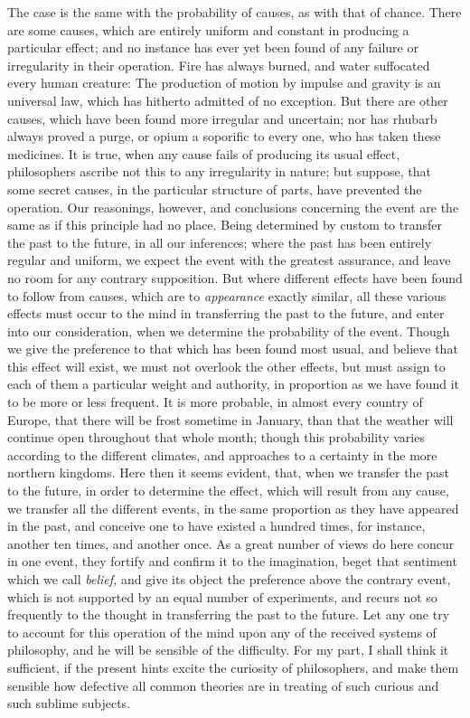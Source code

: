 \documentclass[]{article}
\begin{document}
\begin{sectionbody}
\humeparagraph  The case is the same with the probability of causes, as with that of chance. There are some causes, which are entirely uniform and constant in producing a particular effect; and no instance has ever yet been found of any failure or irregularity in their operation. Fire has always burned, and water suffocated every human creature: The production of motion by impulse and gravity is an universal law, which has hitherto admitted of no exception. But there are other causes, which have been found more irregular and uncertain; nor has rhubarb always proved a purge, or opium a soporific to every one, who has taken these medicines. It is true, when any cause fails of producing its usual effect, philosophers ascribe not this to any irregularity in nature; but suppose, that some secret causes, in the particular structure of parts, have prevented the operation. Our reasonings, however, and conclusions concerning the event are the same as if this principle had no place. Being determined by custom to transfer the past to the future, in all our inferences; where the past has been entirely regular and uniform, we expect the event with the greatest assurance, and leave no room for any contrary supposition. But where different effects have been found to follow from causes, which are to \emph{appearance} exactly similar, all these various effects must occur to the mind in transferring the past to the future, and enter into our consideration, when we determine the probability of the event. Though we give the preference to that which has been found most usual, and believe that this effect will exist, we must not overlook the other effects, but must assign to each of them a particular weight and authority, in proportion as we have found it to be more or less frequent. It is more probable, in almost every country of Europe, that there will be frost sometime in January, than that the weather will continue open throughout that whole month; though this probability varies according to the different climates, and approaches to a certainty in the more northern kingdoms. Here then it seems evident, that, when we transfer the past to the future, in order to determine the effect, which will result from any cause, we transfer all the different events, in the same proportion as they have appeared in the past, and conceive one to have existed a hundred times, for instance, another ten times, and another once. As a great number of views do here concur in one event, they fortify and confirm it to the imagination, beget that sentiment which we call \emph{belief,} and give its object the preference above the contrary event, which is not supported by an equal number of experiments, and recurs not so frequently to the thought in transferring the past to the future. Let any one try to account for this operation of the mind upon any of the received systems of philosophy, and he will be sensible of the difficulty. For my part, I shall think it sufficient, if the present hints excite the curiosity of philosophers, and make them sensible how defective all common theories are in treating of such curious and such sublime subjects.

\end{sectionbody}
\end{document}
